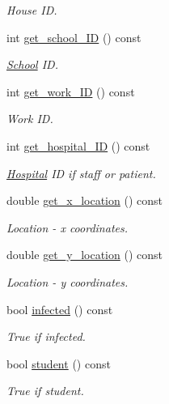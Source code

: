 \begin{DoxyCompactItemize}
\begin{DoxyCompactList}\small\item\em House ID. \end{DoxyCompactList}\item 
int \hyperlink{classAgent_a78c4d92a0f47c27a34f457f492746307}{get\+\_\+school\+\_\+\+ID} () const
\begin{DoxyCompactList}\small\item\em \hyperlink{classSchool}{School} ID. \end{DoxyCompactList}\item 
int \hyperlink{classAgent_a893d27a0906f9578c54fac02c8937e44}{get\+\_\+work\+\_\+\+ID} () const
\begin{DoxyCompactList}\small\item\em Work ID. \end{DoxyCompactList}\item 
int \hyperlink{classAgent_a4b265ac0693d1677fce44c7ace928f70}{get\+\_\+hospital\+\_\+\+ID} () const
\begin{DoxyCompactList}\small\item\em \hyperlink{classHospital}{Hospital} ID if staff or patient. \end{DoxyCompactList}\item 
double \hyperlink{classAgent_aa304e2bd2e7a9564bad10c52b16cef09}{get\+\_\+x\+\_\+location} () const
\begin{DoxyCompactList}\small\item\em Location -\/ x coordinates. \end{DoxyCompactList}\item 
double \hyperlink{classAgent_a6be70e1995c222467a192a90ed9ab7dd}{get\+\_\+y\+\_\+location} () const
\begin{DoxyCompactList}\small\item\em Location -\/ y coordinates. \end{DoxyCompactList}\item 
bool \hyperlink{classAgent_abb85f9353fdaa27e69606b3c1e8fa364}{infected} () const
\begin{DoxyCompactList}\small\item\em True if infected. \end{DoxyCompactList}\item 
bool \hyperlink{classAgent_aaafd3f91e823471cdfdcf4c31cdebd7d}{student} () const
\begin{DoxyCompactList}\small\item\em True if student. \end{DoxyCompactList}\item 

\end{DoxyCompactItemize}
